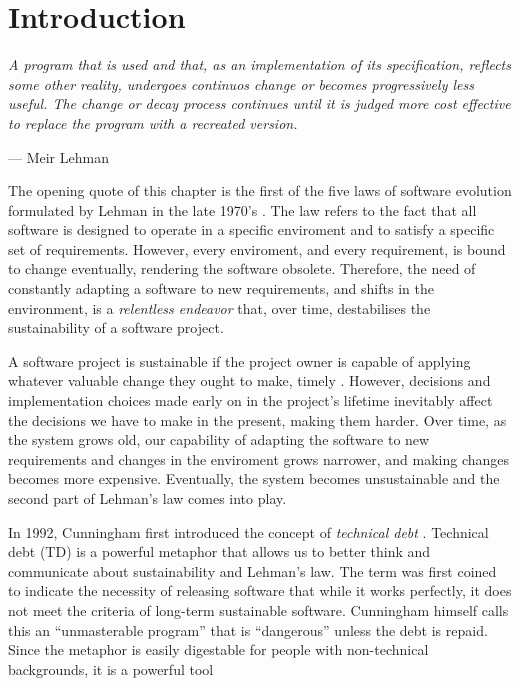 \chapter{Introduction}\label{chap:introduction}

\epigraph{\emph{A program that is used and that, as an implementation of its specification, reflects some other reality, undergoes continuos change or becomes progressively less useful.
The change or decay process continues until it is judged more cost effective to replace the program with a recreated version.}}{--- Meir Lehman}

The opening quote of this chapter is the first of the five laws of software evolution formulated by Lehman in the late 1970's \cite{Lehman1979}.
The law refers to the fact that all software is designed to operate in a specific enviroment and to satisfy a specific set of requirements. 
However, every enviroment, and every requirement, is bound to change eventually, rendering the software obsolete. %
Therefore, the need of constantly adapting a software to new requirements, and shifts in the environment, is a \emph{relentless endeavor} that, over time, destabilises the sustainability of a software project.

A software project is sustainable if the project owner is capable of applying whatever valuable change they ought to make, timely \cite{Winters2020}.
However, decisions and implementation choices made early on in the project's lifetime inevitably affect the decisions we have to make in the present, making them harder.
Over time, as the system grows old, our capability of adapting the software to new requirements and changes in the enviroment grows narrower, and making changes becomes more expensive.
Eventually, the system becomes unsustainable and the second part of Lehman's law comes into play.

In 1992, Cunningham first introduced the concept of \emph{technical debt} \cite{Cunningham1992}. 
Technical debt (TD) is a powerful metaphor that allows us to better think and communicate about sustainability and Lehman's law.
The term was first coined to indicate the necessity of releasing software that while it works perfectly, it does not meet the criteria of long-term sustainable software. 
Cunningham himself calls this an ``unmasterable program'' that is ``dangerous'' unless the debt is repaid.
Since the metaphor is easily digestable for people with non-technical backgrounds, it is a powerful tool

